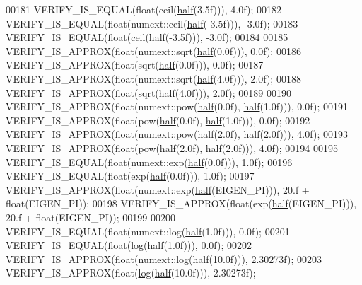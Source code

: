 \begin{DoxyCode}
00181   VERIFY\_IS\_EQUAL(\textcolor{keywordtype}{float}(ceil(\hyperlink{struct_eigen_1_1half}{half}(3.5f))), 4.0f);
00182   VERIFY\_IS\_EQUAL(\textcolor{keywordtype}{float}(numext::ceil(\hyperlink{struct_eigen_1_1half}{half}(-3.5f))), -3.0f);
00183   VERIFY\_IS\_EQUAL(\textcolor{keywordtype}{float}(ceil(\hyperlink{struct_eigen_1_1half}{half}(-3.5f))), -3.0f);
00184 
00185   VERIFY\_IS\_APPROX(\textcolor{keywordtype}{float}(numext::sqrt(\hyperlink{struct_eigen_1_1half}{half}(0.0f))), 0.0f);
00186   VERIFY\_IS\_APPROX(\textcolor{keywordtype}{float}(sqrt(\hyperlink{struct_eigen_1_1half}{half}(0.0f))), 0.0f);
00187   VERIFY\_IS\_APPROX(\textcolor{keywordtype}{float}(numext::sqrt(\hyperlink{struct_eigen_1_1half}{half}(4.0f))), 2.0f);
00188   VERIFY\_IS\_APPROX(\textcolor{keywordtype}{float}(sqrt(\hyperlink{struct_eigen_1_1half}{half}(4.0f))), 2.0f);
00189 
00190   VERIFY\_IS\_APPROX(\textcolor{keywordtype}{float}(numext::pow(\hyperlink{struct_eigen_1_1half}{half}(0.0f), \hyperlink{struct_eigen_1_1half}{half}(1.0f))), 0.0f);
00191   VERIFY\_IS\_APPROX(\textcolor{keywordtype}{float}(pow(\hyperlink{struct_eigen_1_1half}{half}(0.0f), \hyperlink{struct_eigen_1_1half}{half}(1.0f))), 0.0f);
00192   VERIFY\_IS\_APPROX(\textcolor{keywordtype}{float}(numext::pow(\hyperlink{struct_eigen_1_1half}{half}(2.0f), \hyperlink{struct_eigen_1_1half}{half}(2.0f))), 4.0f);
00193   VERIFY\_IS\_APPROX(\textcolor{keywordtype}{float}(pow(\hyperlink{struct_eigen_1_1half}{half}(2.0f), \hyperlink{struct_eigen_1_1half}{half}(2.0f))), 4.0f);
00194 
00195   VERIFY\_IS\_EQUAL(\textcolor{keywordtype}{float}(numext::exp(\hyperlink{struct_eigen_1_1half}{half}(0.0f))), 1.0f);
00196   VERIFY\_IS\_EQUAL(\textcolor{keywordtype}{float}(exp(\hyperlink{struct_eigen_1_1half}{half}(0.0f))), 1.0f);
00197   VERIFY\_IS\_APPROX(\textcolor{keywordtype}{float}(numext::exp(\hyperlink{struct_eigen_1_1half}{half}(EIGEN\_PI))), 20.f + \textcolor{keywordtype}{float}(EIGEN\_PI));
00198   VERIFY\_IS\_APPROX(\textcolor{keywordtype}{float}(exp(\hyperlink{struct_eigen_1_1half}{half}(EIGEN\_PI))), 20.f + \textcolor{keywordtype}{float}(EIGEN\_PI));
00199 
00200   VERIFY\_IS\_EQUAL(\textcolor{keywordtype}{float}(numext::log(\hyperlink{struct_eigen_1_1half}{half}(1.0f))), 0.0f);
00201   VERIFY\_IS\_EQUAL(\textcolor{keywordtype}{float}(\hyperlink{structlog}{log}(\hyperlink{struct_eigen_1_1half}{half}(1.0f))), 0.0f);
00202   VERIFY\_IS\_APPROX(\textcolor{keywordtype}{float}(numext::log(\hyperlink{struct_eigen_1_1half}{half}(10.0f))), 2.30273f);
00203   VERIFY\_IS\_APPROX(\textcolor{keywordtype}{float}(\hyperlink{structlog}{log}(\hyperlink{struct_eigen_1_1half}{half}(10.0f))), 2.30273f);

\end{DoxyCode}
